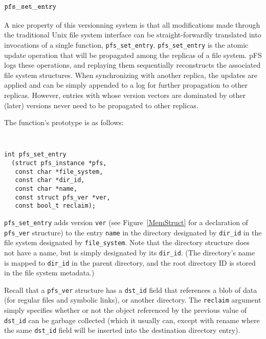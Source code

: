 
\subsection {${\tt pfs\_set\_entry}$}
\label{sec:pfssetentry}

A nice property of this versionning system is that all modifications
made through the traditional Unix file system interface can be
straight-forwardly translated into invocations of a single function,
{\tt pfs\_set\_entry}.  {\tt pfs\_set\_entry} is the atomic update
operation that will be propagated among the replicas of a file system.
pFS logs these operations, and replaying them sequentially
reconstructs the associated file system structures.  When
synchronizing with another replica, the updates are applied and can be
simply appended to a log for further propagation to other replicas.
However, entries with whose version vectors are dominated by other
(later) versions never need to be propagated to other replicas.

The function's prototype is as follows:

\begin{center}
{\tt \small
\begin{verbatim}
int pfs_set_entry 
  (struct pfs_instance *pfs,
   const char *file_system,
   const char *dir_id,
   const char *name,
   const struct pfs_ver *ver,
   const bool_t reclaim);
\end{verbatim}
}
\end{center}

{\tt pfs\_set\_entry} adds version {\tt ver} (see
Figure~\ref{MemStruct} for a declaration of {\tt pfs\_ver} structure)
to the entry {\tt name} in the directory designated by {\tt dir\_id}
in the file system designated by {\tt file\_system}.  Note that the
directory structure does not have a name, but is simply designated by
its {\tt dir\_id}.  (The directory's name is mapped to {\tt dir\_id}
in the parent directory, and the root directory ID is stored in the
file system metadata.)

Recall that a \texttt{pfs\_ver} structure has a \texttt{dst\_id} field
that references a blob of data (for regular files and symbolic links),
or another directory.  The {\tt reclaim} argument simply specifies
whether or not the object referenced by the previous value of
\texttt{dst\_id} can be garbage collected (which it usually can,
except with rename where the same \texttt{dst\_id} field will be
inserted into the destination directory entry).

